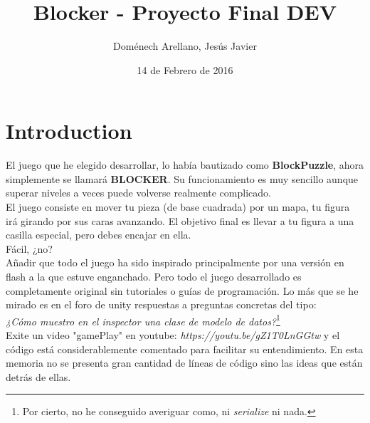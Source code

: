 \documentclass{article}
\title{Blocker - Proyecto Final DEV}
\author{Doménech Arellano, Jesús Javier}
\date{14 de Febrero de 2016}
\begin{document}
\maketitle

\section{Introduction}
El juego que he elegido desarrollar, lo había bautizado como
\textbf{BlockPuzzle}, ahora simplemente se llamará \textbf{BLOCKER}. Su
funcionamiento es muy sencillo aunque superar niveles a veces puede
volverse realmente complicado.\\

El juego consiste en mover tu pieza (de base cuadrada) por un mapa, tu
figura irá girando por sus caras avanzando. El objetivo final es llevar a
tu figura a una casilla especial, pero debes encajar en ella.\\

Fácil, ¿no? \\

Añadir que todo el juego ha sido inspirado principalmente por una versión en flash a la que estuve enganchado. Pero todo el juego desarrollado es completamente original sin tutoriales o guías de programación. Lo más que se he mirado es en el foro de unity respuestas a preguntas concretas del tipo: \\
\emph{¿Cómo muestro en el inspector una clase de modelo de datos?}\footnote{Por cierto, no he conseguido averiguar como, ni \emph{serialize} ni nada.}\\

Exite un video "gamePlay" en youtube: \emph{https://youtu.be/gZ1T0LnGGtw} y el código está considerablemente comentado para facilitar su entendimiento. En esta memoria no se presenta gran cantidad de líneas de código sino las ideas que están detrás de ellas.
\end{document}
